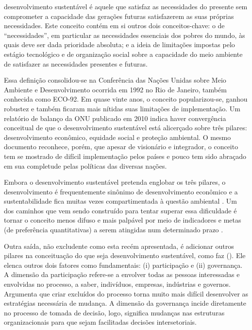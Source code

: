 \begin{citacao}
desenvolvimento sustentável é aquele que satisfaz as necessidades do presente sem comprometer a capacidade das gerações futuras satisfazerem as suas próprias necessidades. Este conceito contém em si outros dois conceitos-chave: o de ``necessidades'', em particular as necessidades essenciais dos pobres do mundo, às quais deve ser dada prioridade absoluta; e a ideia de limitações impostas pelo estágio tecnológico e de organização social sobre a capacidade do meio ambiente de satisfazer as necessidades presentes e futuras. 
\cite[p.41]{WCED1987}
\end{citacao}   

Essa definição consolidou-se na Conferência das Nações Unidas sobre Meio Ambiente e Desenvolvimento ocorrida em 1992 no Rio de Janeiro, também conhecida como ECO-92. Em quase vinte anos, o conceito popularizou-se, ganhou robustez e também ficaram mais nítidas suas limitações de implementação. Um relatório de balanço da ONU publicado em 2010 \cite{ONU2010} indica haver convergência conceitual de que o desenvolvimento sustentável está alicerçado sobre três pilares: desenvolvimento econômico, equidade social e proteção ambiental. O mesmo documento reconhece, porém, que apesar de visionário e integrador, o conceito tem se mostrado de difícil implementação pelos países e pouco tem sido abraçado em sua completude pelas políticas das diversas nações. 

Embora o desenvolvimento sustentável pretenda englobar os três pilares, o desenvolvimento é frequentemente sinônimo de desenvolvimento econômico e a sustentabilidade fica muitas vezes compartimentada à questão ambiental \cite{ONU2010}. Um dos caminhos que vem sendo construído para tentar superar essa dificuldade é tornar o conceito menos difuso e mais palpável por meio de indicadores \cite{CHAMBERS2000,BOULANGER2008,BARRETT2010,FORTES2012} e metas (de preferência quantitativas) a serem atingidas num determinado prazo \cite{ONU2010,ONU2014}.

Outra saída, não excludente como esta recém apresentada, é adicionar outros pilares na conceituação do que seja desenvolvimento sustentável, como faz 
 (\citeyear{BANISTER2005}). Ele elenca outros dois fatores como fundamentais: (i) participação e (ii) governança. A dimensão da participação refere-se a envolver todas as pessoas interessadas e envolvidas no processo, a saber, indivíduos, empresas, indústrias e governos. Argumenta que criar excluídos do processo torna muito mais difícil desenvolver as estratégias necessária de mudança. A dimensão da governança incide diretamente no processo de tomada de decisão, logo, significa mudanças nas estruturas organizacionais para que sejam facilitadas decisões intersetoriais.

